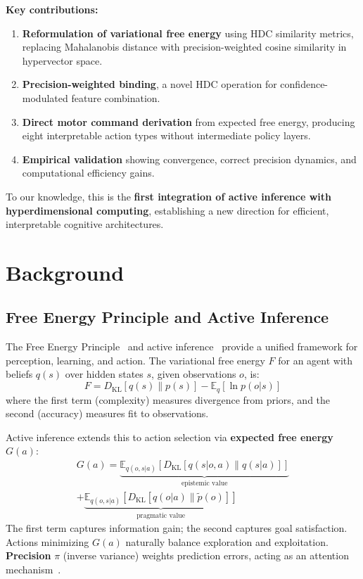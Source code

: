 \documentclass[10pt,letterpaper]{article}
\begin{document}
\textbf{Key contributions:}
\begin{enumerate}[nosep]
  \item \textbf{Reformulation of variational free energy} using HDC similarity metrics, replacing Mahalanobis distance with precision-weighted cosine similarity in hypervector space.
  \item \textbf{Precision-weighted binding}, a novel HDC operation for confidence-modulated feature combination.
  \item \textbf{Direct motor command derivation} from expected free energy, producing eight interpretable action types without intermediate policy layers.
  \item \textbf{Empirical validation} showing convergence, correct precision dynamics, and computational efficiency gains.
\end{enumerate}

To our knowledge, this is the \textbf{first integration of active inference with hyperdimensional computing}, establishing a new direction for efficient, interpretable cognitive architectures.


\section{Background}

\subsection{Free Energy Principle and Active Inference}

The Free Energy Principle~\cite{friston2010free} and active inference~\cite{parr2022active} provide a unified framework for perception, learning, and action.
The variational free energy $F$ for an agent with beliefs $q(s)$ over hidden states $s$, given observations $o$, is:
\begin{equation}
F = D_{\mathrm{KL}}[q(s) \| p(s)] - \mathbb{E}_q[\ln p(o|s)]
\label{eq:free-energy}
\end{equation}
where the first term (complexity) measures divergence from priors, and the second (accuracy) measures fit to observations.

Active inference extends this to action selection via \textbf{expected free energy} $G(a)$:
\begin{multline}
G(a) = \underbrace{\mathbb{E}_{q(o,s|a)}[D_{\mathrm{KL}}[q(s|o,a) \| q(s|a)]]}_{\text{epistemic value}} \\
  + \underbrace{\mathbb{E}_{q(o,s|a)}[D_{\mathrm{KL}}[q(o|a) \| \tilde{p}(o)]]}_{\text{pragmatic value}}
\label{eq:efe}
\end{multline}
The first term captures information gain; the second captures goal satisfaction.
Actions minimizing $G(a)$ naturally balance exploration and exploitation.
\textbf{Precision} $\pi$ (inverse variance) weights prediction errors, acting as an attention mechanism~\cite{feldman2010attention}.
\end{document}

